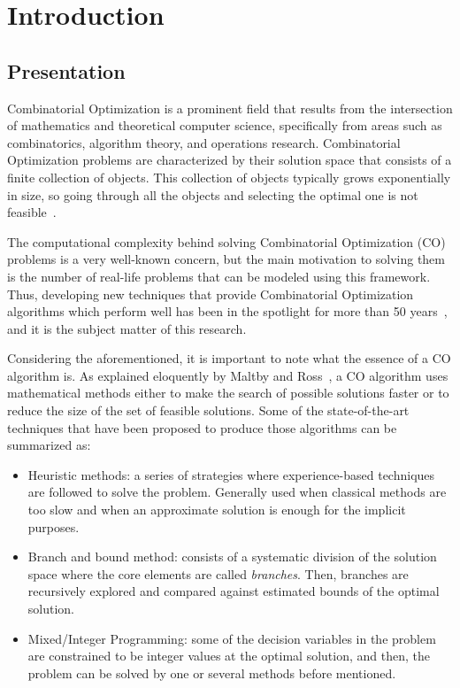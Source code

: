 %
%
\let\textcircled=\pgftextcircled
\chapter{Introduction}
\label{Chapter1}

\section{Presentation}
Combinatorial Optimization is a prominent field that results from the intersection of mathematics and theoretical computer science, specifically from areas such as combinatorics, algorithm theory, and operations research. Combinatorial Optimization problems are characterized by their solution space that consists of a finite collection of objects. This collection of objects typically grows exponentially in size, so going through all the objects and selecting the optimal one is not feasible~\cite{schrijver-book}.

The computational complexity behind solving Combinatorial Optimization (CO) problems is a very well-known concern, but the main motivation to solving them is the number of real-life problems that can be modeled using this framework. Thus, developing new techniques that provide Combinatorial Optimization algorithms which perform well has been in the spotlight for more than 50 years~\cite{appcombinatorial}, and it is the subject matter of this research.

Considering the aforementioned, it is important to note what the essence of a CO algorithm is. As explained eloquently by Maltby and Ross~\cite{brilliant}, a CO algorithm uses mathematical methods either to make the search of possible solutions faster or to reduce the size of the set of feasible solutions. Some of the state-of-the-art techniques that have been proposed to produce those algorithms can be summarized as:

\begin{itemize}
\item Heuristic methods: a series of strategies where experience-based techniques are followed to solve the problem. Generally used when classical methods are too slow and when an approximate solution is enough for the implicit purposes.%
\item Branch and bound method: consists of a systematic division of the solution space where the core elements are called \textit{branches}. Then, branches are recursively explored and compared against estimated bounds of the optimal solution. \cite{branchbound}
\item Mixed/Integer Programming: some of the decision variables in the problem are constrained to be integer values at the optimal solution, and then, the problem can be solved by one or several methods before mentioned.
\end{itemize}

